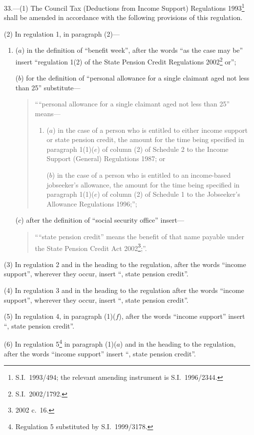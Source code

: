 \documentclass[12pt,a4paper]{article}
\begin{document}
33.---(1)  The Council Tax (Deductions from Income Support) Regulations 1993\footnote{S.I.\ 1993/494; the relevant amending instrument is S.I.\ 1996/2344.} shall be amended in accordance with the following provisions of this regulation.

(2) In regulation 1, in paragraph (2)—
\begin{enumerate}\item[]
($a$) in the definition of “benefit week”, after the words “as the case may be” insert “regulation 1(2) of the State Pension Credit Regulations 2002\footnote{S.I.\ 2002/1792.} or”;

($b$) for the definition of “personal allowance for a single claimant aged not less than 25” substitute—
\begin{quotation}
    ““personal allowance for a single claimant aged not less than 25” means—
\begin{enumerate}\item[]
    ($a$) 
    in the case of a person who is entitled to either income support or state pension credit, the amount for the time being specified in paragraph 1(1)($e$)  of column (2) of Schedule 2 to the Income Support (General) Regulations 1987; or

    ($b$) 
    in the case of a person who is entitled to an income-based jobseeker’s allowance, the amount for the time being specified in paragraph 1(1)($e$)  of column (2) of Schedule 1 to the Jobseeker’s Allowance Regulations 1996;”; 
\end{enumerate}
\end{quotation}

($c$) after the definition of “social security office” insert—
\begin{quotation}
““state pension credit” means the benefit of that name payable under the State Pension Credit Act 2002\footnote{2002 c.\ 16.};”.
\end{quotation}
\end{enumerate}

(3) In regulation 2 and in the heading to the regulation, after the words “income support”, wherever they occur, insert “, state pension credit”.

(4) In regulation 3 and in the heading to the regulation after the words “income support”, wherever they occur, insert “, state pension credit”.

(5) In regulation 4, in paragraph (1)($f$), after the words “income support” insert “, state pension credit”.

(6) In regulation 5\footnote{Regulation 5 substituted by S.I.\ 1999/3178.} in paragraph (1)($a$)  and in the heading to the regulation, after the words “income support” insert “, state pension credit”.
\end{document}
